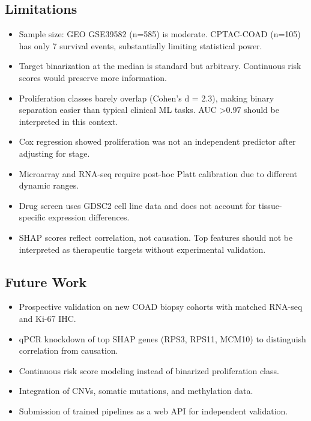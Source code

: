\documentclass[11pt]{article}
\begin{document}
\subsection*{Limitations}
\begin{itemize}
    \item Sample size: GEO GSE39582 (n=585) is moderate. CPTAC-COAD (n=105) has only 7 survival events, substantially limiting statistical power.
    \item Target binarization at the median is standard but arbitrary. Continuous risk scores would preserve more information.
    \item Proliferation classes barely overlap (Cohen's d = 2.3), making binary separation easier than typical clinical ML tasks. AUC >0.97 should be interpreted in this context.
    \item Cox regression showed proliferation was not an independent predictor after adjusting for stage.
    \item Microarray and RNA-seq require post-hoc Platt calibration due to different dynamic ranges.
    \item Drug screen uses GDSC2 cell line data and does not account for tissue-specific expression differences.
    \item SHAP scores reflect correlation, not causation. Top features should not be interpreted as therapeutic targets without experimental validation.
\end{itemize}

\subsection*{Future Work}
\begin{itemize}
    \item Prospective validation on new COAD biopsy cohorts with matched RNA-seq and Ki-67 IHC.
    \item qPCR knockdown of top SHAP genes (RPS3, RPS11, MCM10) to distinguish correlation from causation.
    \item Continuous risk score modeling instead of binarized proliferation class.
    \item Integration of CNVs, somatic mutations, and methylation data.
    \item Submission of trained pipelines as a web API for independent validation.
\end{itemize}
\end{document}
